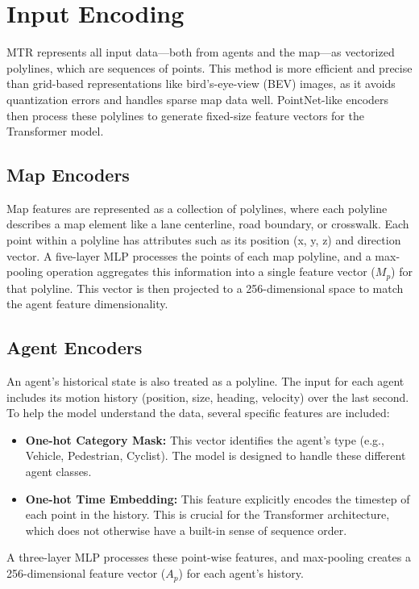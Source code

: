 \section{Input Encoding}
\label{sec:model_input_encoding}
MTR represents all input data—both from agents and the map—as vectorized polylines, which are sequences of points. This method is more efficient and precise than grid-based representations like bird's-eye-view (BEV) images, as it avoids quantization errors and handles sparse map data well. PointNet-like encoders then process these polylines to generate fixed-size feature vectors for the Transformer model.

\subsection{Map Encoders}
Map features are represented as a collection of polylines, where each polyline describes a map element like a lane centerline, road boundary, or crosswalk. Each point within a polyline has attributes such as its position (x, y, z) and direction vector. A five-layer MLP processes the points of each map polyline, and a max-pooling operation aggregates this information into a single feature vector ($M_p$) for that polyline. This vector is then projected to a 256-dimensional space to match the agent feature dimensionality.

\subsection{Agent Encoders}
An agent's historical state is also treated as a polyline. The input for each agent includes its motion history (position, size, heading, velocity) over the last second. To help the model understand the data, several specific features are included:
\begin{itemize}
    \item \textbf{One-hot Category Mask:} This vector identifies the agent's type (e.g., Vehicle, Pedestrian, Cyclist). The model is designed to handle these different agent classes.
    \item \textbf{One-hot Time Embedding:} This feature explicitly encodes the timestep of each point in the history. This is crucial for the Transformer architecture, which does not otherwise have a built-in sense of sequence order.
\end{itemize}
A three-layer MLP processes these point-wise features, and max-pooling creates a 256-dimensional feature vector ($A_p$) for each agent's history.

